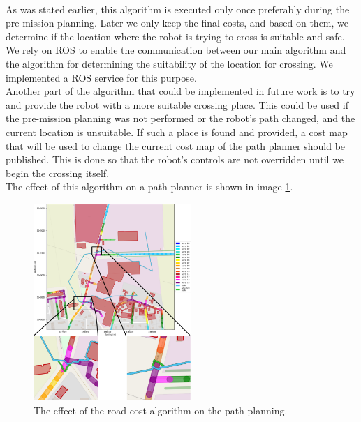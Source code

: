         \\
            As was stated earlier, this algorithm is executed only once preferably during the pre-mission planning. Later we only keep the final costs, and based on them, we determine if the location where the robot is trying to cross is suitable and safe.\\
            We rely on ROS to enable the communication between our main algorithm and the algorithm for determining the suitability of the location for crossing. We implemented a ROS service for this purpose.\\
            Another part of the algorithm that could be implemented in future work is to try and provide the robot with a more suitable crossing place. This could be used if the pre-mission planning was not performed or the robot's path changed, and the current location is unsuitable. If such a place is found and provided, a cost map that will be used to change the current cost map of the path planner should be published. This is done so that the robot's controls are not overridden until we begin the crossing itself.\\
            The effect of this algorithm on a path planner is shown in image \ref{fig:path}.
            \begin{figure}[ht]
                \centering
                \includegraphics[width=0.53\textwidth]{images/path.png}
                \caption{The effect of the road cost algorithm on the path planning.}
                \label{fig:path}
            \end{figure}

